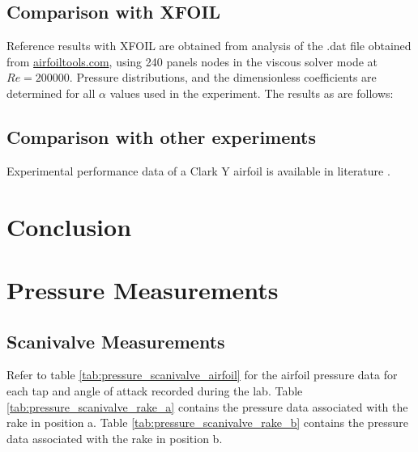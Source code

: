 \documentclass[runningheads]{llncs}
\begin{document}
\subsection{Comparison with XFOIL}
Reference results with XFOIL are obtained from analysis of the .dat file obtained from \href{http://airfoiltools.com/airfoil/details?airfoil=clarky-il}{airfoiltools.com}, using 240 panels nodes in the viscous solver mode at $Re = 200000$. Pressure distributions, and the dimensionless coefficients are determined for all $\alpha$ values used in the experiment. The results as are follows:

\subsection{Comparison with other experiments}
Experimental performance data of a Clark Y airfoil is available in literature
\cite{lyon_broeren_giguere_gopalarathnam_selig_1997}.



\section{Conclusion}










\appendix

\section{Pressure Measurements}

\subsection{Scanivalve Measurements}

Refer to table \ref{tab:pressure_scanivalve_airfoil} for the airfoil pressure data for each tap and angle of attack recorded during the lab. Table \ref{tab:pressure_scanivalve_rake_a} contains the pressure data associated with the rake in position a. Table \ref{tab:pressure_scanivalve_rake_b} contains the pressure data associated with the rake in position b.
\end{document}
